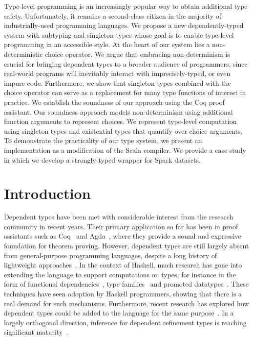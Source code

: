 Type-level programming is an increasingly popular way to obtain additional type safety.
Unfortunately, it remains a second-class citizen in the majority of industrially-used programming languages.
We propose a new dependently-typed system with subtyping and singleton types whose goal is to enable type-level programming in an accessible style.
At the heart of our system lies a non-deterministic choice operator.
We argue that embracing non-determinism is crucial for bringing dependent types to a broader audience of programmers, since real-world programs will inevitably interact with imprecisely-typed, or even impure code.
Furthermore, we show that singleton types combined with the choice operator can serve as a replacement for many type functions of interest in practice.
We establish the soundness of our approach using the Coq proof assistant.
Our soundness approach models non-determinism using additional function arguments to represent choices.
We represent type-level computation using singleton types and existential types that quantify over choice arguments.
To demonstrate the practicality of our type system, we present an implementation as a modification of the Scala compiler.
We provide a case study in which we develop a strongly-typed wrapper for Spark datasets.

\section{Introduction}

Dependent types have been met with considerable interest from the research community in recent years.
Their primary application so far has been in proof assistants such as Coq~\citep{bertot2004interactive} and Agda~\citep{norell2007towards}, where they provide a sound and expressive foundation for theorem proving.
However, dependent types are still largely absent from general-purpose programming languages, despite a long history of lightweight approaches~\citep{xi1998eliminating}.
In the context of Haskell, much research has gone into extending the language to support computations on types, for instance in the form of functional dependencies~\citep{jones2000type}, type families~\citep{kiselyov2010fun} and promoted datatypes~\citep{yorgey2012giving}.
These techniques have seen adoption by Haskell programmers, showing that there is a real demand for such mechanisms.
Furthermore, recent research has explored how dependent types could be added to the language for the same purpose~\citep{eisenberg2016dependent, weirich2017a}.
In a largely orthogonal direction, inference for dependent refinement types is reaching significant maturity~\citep{vazou2018gradual, vazou2017refinement,vazou2015bounded}.


